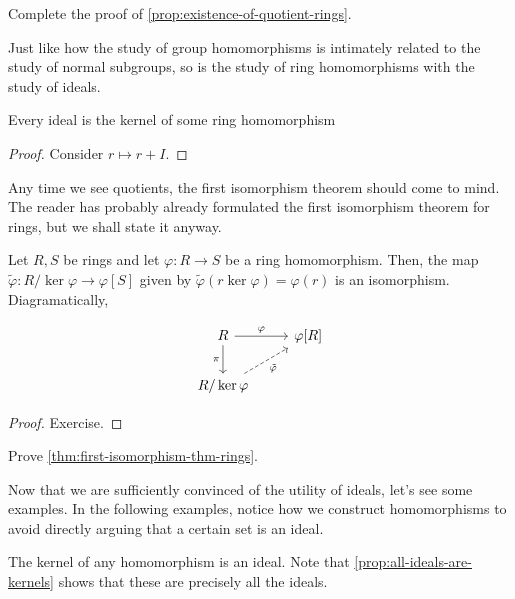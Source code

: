 \documentclass[./main.tex]{subfiles}
\begin{document}
\begin{exercise}
    Complete the proof of \cref{prop:existence-of-quotient-rings}.
\end{exercise}

Just like how the study of group homomorphisms is intimately related to the
study of normal subgroups, so is the study of ring homomorphisms with the study
of ideals.

\begin{proposition}
\label{prop:all-ideals-are-kernels}
    Every ideal is the kernel of some ring homomorphism
\end{proposition}
\begin{proof}
    Consider $r \mapsto r + I$.
\end{proof}

Any time we see quotients, the first isomorphism theorem should come to mind.
The reader has probably already formulated the first isomorphism theorem for
rings, but we shall state it anyway.

\begin{theorem}
\label{thm:first-isomorphism-thm-rings}
Let $R, S$ be rings and let $\varphi: R \to S$ be a ring homomorphism. Then, the
map $\tilde \varphi: R/\ker \varphi \to \varphi[S]$ given by $\tilde \varphi(r
\ker \varphi) = \varphi(r)$ is an isomorphism. Diagramatically,

\[\begin{tikzcd}
	R & {\varphi[R]} \\
	{R / \ker \varphi}
	\arrow["\varphi", from=1-1, to=1-2]
	\arrow["\pi"', from=1-1, to=2-1]
	\arrow["\tilde\varphi"', dashed, from=2-1, to=1-2]
\end{tikzcd}\]

\end{theorem}

\begin{proof}
    Exercise.
\end{proof}
\begin{exercise}
    Prove \cref{thm:first-isomorphism-thm-rings}. 
\end{exercise}

Now that we are sufficiently convinced of the utility of ideals, let's see some
examples. In the following examples, notice how we construct homomorphisms to
avoid directly arguing that a certain set is an ideal.

\begin{example}
    The kernel of any homomorphism is an ideal. Note that
    \cref{prop:all-ideals-are-kernels} shows that these are precisely all the
    ideals. 
\end{example}
\end{document}

